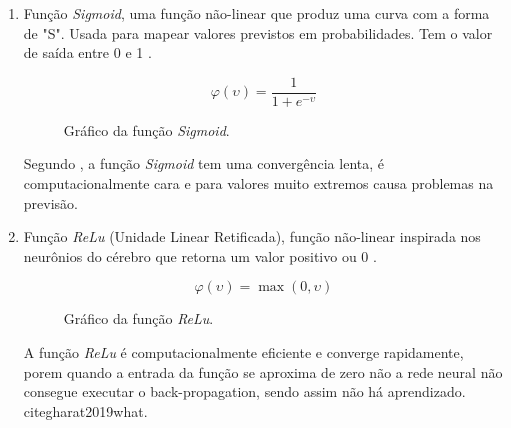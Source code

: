 \begin{enumerate}
	\item Função \textit{Sigmoid}, uma função não-linear que produz uma curva com a forma de "S". Usada para mapear valores previstos em probabilidades. Tem o valor de saída entre 0 e 1 \cite{gharat2019what}.
	\begin{figure}[H]
	\caption{Gráfico da função \textit{Sigmoid}.}
	\begin{center}
		\begin{minipage}{0.45\textwidth}
			$$\varphi(\upsilon) = \frac{1}{1 + e^{-\upsilon}}$$
		\end{minipage}
		\hfill
		\begin{minipage}{0.45\textwidth}
		\end{minipage}
	\end{center}
	\label{fig:grafico_sigmoid}
	\end{figure}
	Segundo , a função \textit{Sigmoid} tem uma convergência lenta, é computacionalmente cara e para valores muito extremos causa problemas na previsão.

	\item Função \textit{ReLu} (Unidade Linear Retificada), função não-linear inspirada nos neurônios do cérebro que retorna um valor positivo ou 0 \cite{rizzo2020inteligencia}.
	\begin{figure}[H]
	\caption{Gráfico da função \textit{ReLu}.}
	\begin{center}
		\begin{minipage}{0.45\textwidth}
			$$\varphi(\upsilon) = \max(0,\upsilon)$$
		\end{minipage}
		\hfill
		\begin{minipage}{0.45\textwidth}
		\end{minipage}
	\end{center}
	\label{fig:grafico_relu}
	\end{figure}
	A função \textit{ReLu} é computacionalmente eficiente e converge rapidamente, porem quando a entrada da função se aproxima de zero não a rede neural não consegue executar o back-propagation, sendo assim não há aprendizado. cite{gharat2019what}.


\end{enumerate}
